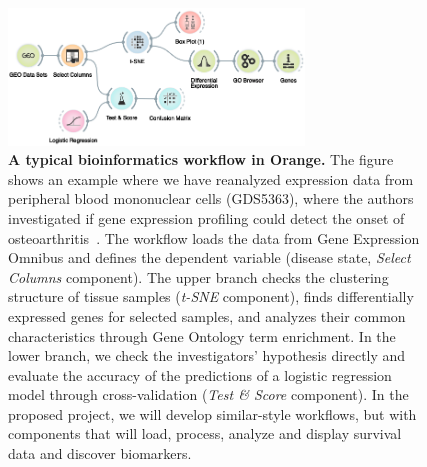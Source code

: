 \documentclass[11pt,a4paper]{article}
\renewcommand{\bold}{\textbf}
\begin{document}
\begin{figure}[htbp]
\includegraphics[width=0.7\textwidth]{orange-workflow}
\caption{\small\bold{A typical bioinformatics workflow in Orange.} The figure shows an example where we have reanalyzed expression data from peripheral blood mononuclear cells (GDS5363), where the authors investigated if gene expression profiling could detect the onset of osteoarthritis~\cite{Ramos2014}. The workflow loads the data from Gene Expression Omnibus and defines the dependent variable (disease state, {\em Select Columns} component). The upper branch checks the clustering structure of tissue samples ({\em t-SNE} component), finds differentially expressed genes for selected samples, and analyzes their common characteristics through Gene Ontology term enrichment. In the lower branch, we check the investigators’ hypothesis directly and evaluate the accuracy of the predictions of a logistic regression model through cross-validation ({\em Test \& Score} component). In the proposed project, we will develop similar-style workflows, but with components that will load, process, analyze and display survival data and discover biomarkers.}
\label{fig:orange-workflow}
\end{figure}
\end{document}
